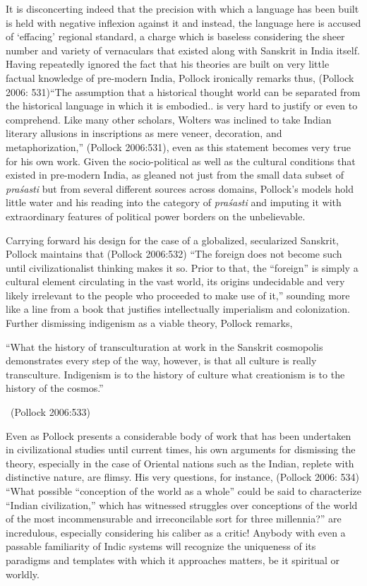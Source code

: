 It is disconcerting indeed that the precision with which a language has been built is held with negative inflexion against it and instead, the language here is accused of ‘effacing’ regional standard, a charge which is baseless considering the sheer number and variety of vernaculars that existed along with Sanskrit in India itself. Having repeatedly ignored the fact that his theories are built on very little factual knowledge of pre-modern India, Pollock ironically remarks thus, (Pollock 2006: 531)“The assumption that a historical thought world can be separated from the historical language in which it is embodied.. is very hard to justify or even to comprehend. Like many other scholars, Wolters was inclined to take Indian literary allusions in inscriptions as mere veneer, decoration, and metaphorization,” (Pollock 2006:531), even as this statement becomes very true for his own work. Given the socio-political as well as the cultural conditions that existed in pre-modern India, as gleaned not just from the small data subset of \textit{praśasti} but from several different sources across domains, Pollock’s models hold little water and his reading into the category of \textit{praśasti} and imputing it with extraordinary features of political power borders on the unbelievable.

Carrying forward his design for the case of a globalized, secularized Sanskrit, Pollock maintains that (Pollock 2006:532) “The foreign does not become such until civilizationalist thinking makes it so. Prior to that, the “foreign” is simply a cultural element circulating in the vast world, its origins undecidable and very likely irrelevant to the people who proceeded to make use of it,” sounding more like a line from a book that justifies intellectually imperialism and colonization. Further dismissing indigenism as a viable theory, Pollock remarks,

\begin{myquote}
“What the history of transculturation at work in the Sanskrit cosmopolis demonstrates every step of the way, however, is that all culture is really transculture. Indigenism is to the history of culture what creationism is to the history of the cosmos.” 

~\hfill (Pollock 2006:533)
\end{myquote}

Even as Pollock presents a considerable body of work that has been undertaken in civilizational studies until current times, his own arguments for dismissing the theory, especially in the case of Oriental nations such as the Indian, replete with distinctive nature, are flimsy. His very questions, for instance, (Pollock 2006: 534) “What possible “conception of the world as a whole” could be said to characterize “Indian civilization,” which has witnessed struggles over conceptions of the world of the most incommensurable and irreconcilable sort for three millennia?” are incredulous, especially considering his caliber as a critic! Anybody with even a passable familiarity of Indic systems will recognize the uniqueness of its paradigms and templates with which it approaches matters, be it spiritual or worldly.

